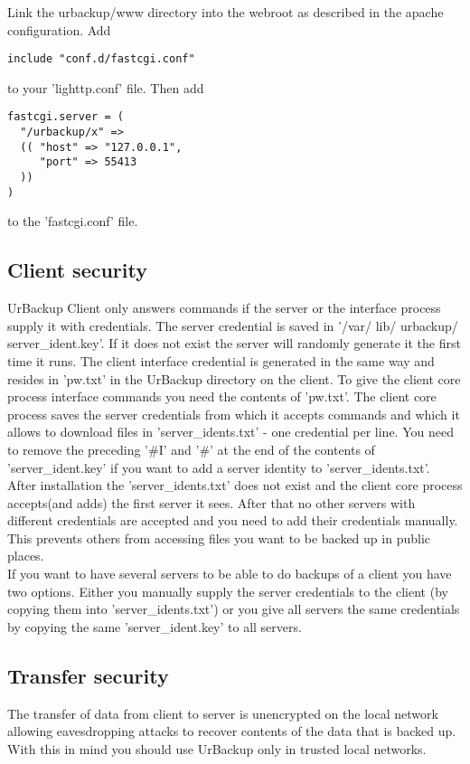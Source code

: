 \documentclass[a4paper,10pt]{article}
\begin{document}
Link the urbackup/www directory into the webroot as described in the apache configuration.
Add
\begin{verbatim}
include "conf.d/fastcgi.conf"
\end{verbatim}
to your 'lighttp.conf' file. Then add 
\begin{verbatim}
fastcgi.server = (
  "/urbackup/x" =>
  (( "host" => "127.0.0.1",
     "port" => 55413
  ))
)
\end{verbatim}
to the 'fastcgi.conf' file.

\subsection{Client security}

UrBackup Client only answers commands if the server or the interface process supply it with credentials. The server credential is saved in '/var/ lib/ urbackup/ server\_ident.key'. If it does not exist the server will randomly generate it the first time it runs. The client interface credential is generated in the same way and resides in 'pw.txt' in the UrBackup directory on the client. To give the client core process interface commands you need the contents of 'pw.txt'. The client core process saves the server credentials from which it accepts commands and which it allows to download files in 'server\_idents.txt' - one credential per line. You need to remove the preceding '\#I' and '\#' at the end of the contents of 'server\_ident.key' if you want to add a server identity to 'server\_idents.txt'. After installation the 'server\_idents.txt' does not exist and the client core process accepts(and adds) the first server it sees. After that no other servers with different credentials are accepted and you need to add their credentials manually. This prevents others from accessing files you want to be backed up in public places.\\
If you want to have several servers to be able to do backups of a client you have two options. Either you manually supply the server credentials to the client (by copying them into 'server\_idents.txt') or you give all servers the same credentials by copying the same 'server\_ident.key' to all servers.

\subsection{Transfer security}

The transfer of data from client to server is unencrypted on the local
network allowing eavesdropping attacks to recover contents of the data that is
backed up. With this in mind you should use UrBackup only in trusted local
networks.
\end{document}

